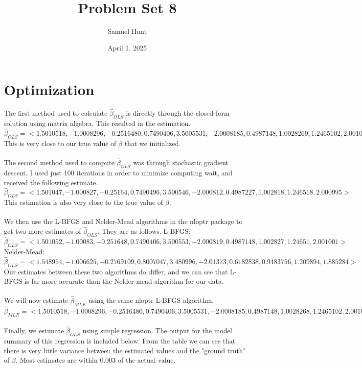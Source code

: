 \documentclass{article}
\title{Problem Set 8}
\author{Samuel Hunt}
\date{April 1, 2025}
\begin{document}
\maketitle  %

\section{Optimization}
The first method used to calculate $\hat{\beta}_{OLS}$ is directly through the closed-form solution using matrix algebra. This resulted in the estimation. 
\\$\hat{\beta}_{OLS} = <1.5010518, -1.0008296, -0.2516480, 0.7490406, 3.5005531, -2.0008185, 0.4987148, 1.0028269, 1.2465102, 2.0010012>
$
\\This is very close to our true value of $\beta$ that we initialized.
\\
\\The second method used to compute $\hat{\beta}_{OLS}$ was through stochastic gradient descent. I used just 100 iterations in order to minimize computing wait, and received the following estimate.
\\$\hat{\beta}_{OLS} = <1.501047, -1.000827, -0.25164, 0.7490496, 3.500546, -2.000812, 0.4987227, 1.002818, 1.246518, 2.000995>
$
\\This estimation is also very close to the true value of $\beta$.
\\
\\We then use the L-BFGS and Nelder-Mead algorithms in the nloptr package to get two more estimates of $\hat{\beta}_{OLS}$. They are as follows. L-BFGS:
\\$\hat{\beta}_{OLS} = <1.501052, -1.00083, -0.251648, 0.7490406, 3.500553, -2.000819, 0.4987148, 1.002827, 1.24651, 2.001001>
$
\\Nelder-Mead:
\\$\hat{\beta}_{OLS} = <1.548954, -1.006625, -0.2769109, 0.8007047, 3.480996, -2.01373, 0.6182838, 0.9483756, 1.209894, 1.885284>
$
\\Our estimates between these two algorithms do differ, and we can see that L-BFGS is far more accurate than the Nelder-mead algorithm for our data.
\\
\\We will now estimate $\hat{\beta}_{MLE}$ using the same nloptr L-BFGS algorithm.
\\$\hat{\beta}_{MLE} = <1.5010518, -1.0008296, -0.2516480,  0.7490406,  3.5005531, -2.0008185,  0.4987148, 1.0028268,  1.2465102,  2.0010012>$
\\
\\Finally, we estimate $\hat{\beta}_{OLS}$ using simple regression. The output for the model summary of this regression is included below. From the table we can see that there is very little variance between the estimated values and the "ground truth" of $\beta$. Most estimates are within $0.003$ of the actual value.
\end{document}

